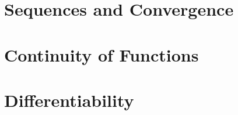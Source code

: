 \documentclass[british,11pt,a4paper]{report}
\begin{document}
\maketitle
\tableofcontents
\chapter{Sequences and Convergence}

\chapter{Continuity of Functions}

\chapter{Differentiability}

\end{document}
